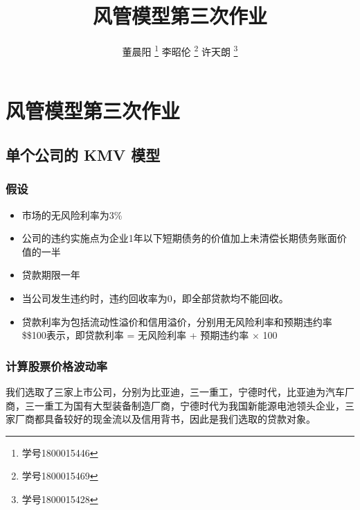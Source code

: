 \documentclass[11pt]{article}
\author{
    董晨阳 \thanks{学号1800015446}
    李昭伦 \thanks{学号1800015469}
    许天朗 \thanks{学号1800015428}
}
\title{风管模型第三次作业}
\providecommand{\tightlist}{%
      \setlength{\itemsep}{0pt}\setlength{\parskip}{0pt}}
\begin{document}
    \maketitle




    \hypertarget{ux98ceux7ba1ux6a21ux578bux7b2cux4e09ux6b21ux4f5cux4e1a}{%
\section{风管模型第三次作业}\label{ux98ceux7ba1ux6a21ux578bux7b2cux4e09ux6b21ux4f5cux4e1a}}



    \hypertarget{ux5355ux4e2aux516cux53f8ux7684-kmv-ux6a21ux578b}{%
\subsection{单个公司的 KMV
模型}\label{ux5355ux4e2aux516cux53f8ux7684-kmv-ux6a21ux578b}}

\hypertarget{ux5047ux8bbe}{%
\subsubsection{假设}\label{ux5047ux8bbe}}

\begin{itemize}
\tightlist
\item
  市场的无风险利率为3\%
\item
  公司的违约实施点为企业1年以下短期债务的价值加上未清偿长期债务账面价值的一半
\item
  贷款期限一年
\item
  当公司发生违约时，违约回收率为0，即全部贷款均不能回收。
\item
  贷款利率为包括流动性溢价和信用溢价，分别用无风险利率和预期违约率\$\times\$100表示，即贷款利率
  = 无风险利率 + 预期违约率 \(\times\) 100
\end{itemize}

\hypertarget{ux8ba1ux7b97ux80a1ux7968ux4ef7ux683cux6ce2ux52a8ux7387}{%
\subsubsection{计算股票价格波动率}\label{ux8ba1ux7b97ux80a1ux7968ux4ef7ux683cux6ce2ux52a8ux7387}}

我们选取了三家上市公司，分别为比亚迪，三一重工，宁德时代，比亚迪为汽车厂商，三一重工为国有大型装备制造厂商，宁德时代为我国新能源电池领头企业，三家厂商都具备较好的现金流以及信用背书，因此是我们选取的贷款对象。
\end{document}
